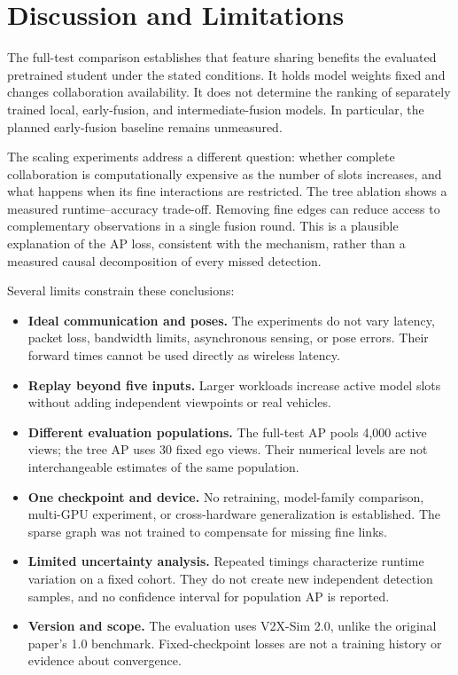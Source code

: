 \section{Discussion and Limitations}
The full-test comparison establishes that feature sharing benefits the
evaluated pretrained student under the stated conditions. It holds model
weights fixed and changes collaboration availability. It does not determine
the ranking of separately trained local, early-fusion, and intermediate-fusion
models. In particular, the planned early-fusion baseline remains unmeasured.

The scaling experiments address a different question: whether complete
collaboration is computationally expensive as the number of slots increases,
and what happens when its fine interactions are restricted. The tree ablation
shows a measured runtime--accuracy trade-off. Removing fine edges can reduce
access to complementary observations in a single fusion round. This is a
plausible explanation of the AP loss, consistent with the mechanism, rather
than a measured causal decomposition of every missed detection.

Several limits constrain these conclusions:
\begin{itemize}
  \setlength{\itemsep}{0pt}
  \setlength{\parsep}{0pt}
  \item \textbf{Ideal communication and poses.} The experiments do not vary
    latency, packet loss, bandwidth limits, asynchronous sensing, or pose
    errors. Their forward times cannot be used directly as wireless latency.
  \item \textbf{Replay beyond five inputs.} Larger workloads increase active
    model slots without adding independent viewpoints or real vehicles.
  \item \textbf{Different evaluation populations.} The full-test AP pools
    4,000 active views; the tree AP uses 30 fixed ego views. Their numerical
    levels are not interchangeable estimates of the same population.
  \item \textbf{One checkpoint and device.} No retraining, model-family
    comparison, multi-GPU experiment, or cross-hardware generalization is
    established. The sparse graph was not trained to compensate for missing
    fine links.
  \item \textbf{Limited uncertainty analysis.} Repeated timings characterize
    runtime variation on a fixed cohort. They do not create new independent
    detection samples, and no confidence interval for population AP is
    reported.
  \item \textbf{Version and scope.} The evaluation uses V2X-Sim 2.0, unlike
    the original paper's 1.0 benchmark. Fixed-checkpoint losses are not a
    training history or evidence about convergence.
\end{itemize}

